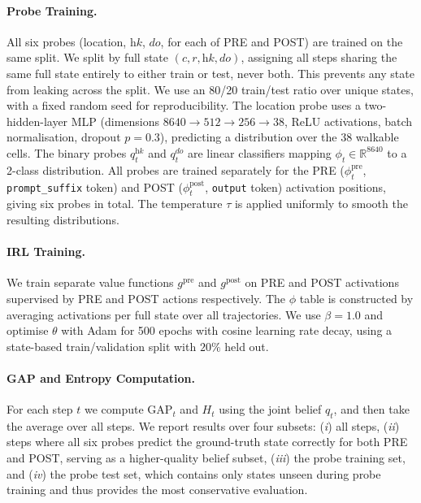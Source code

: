 \documentclass[final]{sparreport}
\begin{document}
\paragraph{Probe Training.}
All six probes (location, $\textit{hk}$, $\textit{do}$, for each of PRE and POST) 
are trained on the same split. We split by full state $(c, r, \textit{hk}, 
\textit{do})$, assigning all steps sharing the same full state entirely to either 
train or test, never both. This prevents any state from leaking across the split. 
We use an 80/20 train/test ratio over unique states, with a fixed random seed for 
reproducibility. The location probe uses a two-hidden-layer MLP
(dimensions $8640 \to 512 \to 256 \to 38$, ReLU activations, batch normalisation,
dropout $p=0.3$), predicting a distribution over the 38 walkable cells.
The binary probes $q_t^{\textit{hk}}$ and $q_t^{\textit{do}}$ are linear classifiers
mapping $\phi_t \in \mathbb{R}^{8640}$ to a 2-class distribution.
All probes are trained separately for the PRE ($\phi_t^{\text{pre}}$,
\texttt{prompt\_suffix} token) and POST ($\phi_t^{\text{post}}$, \texttt{output} token)
activation positions, giving six probes in total.
The temperature $\tau$ is applied uniformly to smooth the resulting distributions.

\paragraph{IRL Training.}
We train separate value functions $g^{\text{pre}}$ and $g^{\text{post}}$ on PRE 
and POST activations supervised by PRE and POST actions respectively. The $\phi$ table is constructed by averaging 
activations per full state over all trajectories. We use $\beta = 1.0$ and 
optimise $\theta$ with Adam for 500 epochs with cosine learning rate decay, 
using a state-based train/validation split with $20\%$ held out.

\paragraph{GAP and Entropy Computation.}
For each step $t$ we compute $\text{GAP}_t$ and $H_t$ using the joint belief 
$q_t$, and then take the average over all steps. We report results over four subsets: 
(\textit{i}) all steps, 
(\textit{ii}) steps where all six probes predict the ground-truth state correctly 
for both PRE and POST, serving as a higher-quality belief subset, 
(\textit{iii}) the probe training set, and 
(\textit{iv}) the probe test set, which contains only states unseen during probe 
training and thus provides the most conservative evaluation.
\end{document}
